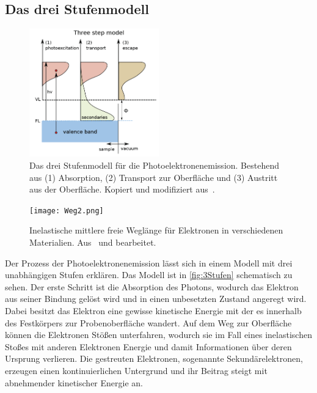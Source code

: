         \subsection{Das drei Stufenmodell} \label{sec:3Stufen}
            \begin{figure}
                \centering
                \includegraphics[width=0.5\textwidth]{3Stufen}
                \caption{Das drei Stufenmodell für die Photoelektronenemission.
                Bestehend aus (1) Absorption, (2) Transport zur Oberfläche und (3) Austritt aus der Oberfläche.
                Kopiert und modifiziert aus~\cite{zhang_synchrotron_2018}.}
                \label{fig:3Stufen}
            \end{figure}
            \begin{figure}
                \centering
                \texttt{[image: Weg2.png]}
                \caption{Inelastische mittlere freie Weglänge für Elektronen in verschiedenen Materialien. Aus~\cite{Hüfner} und bearbeitet.}
                \label{fig:Weg}
            \end{figure}
            Der Prozess der Photoelektronenemission lässt sich in einem Modell mit drei unabhängigen Stufen erklären.
            Das Modell ist in \autoref{fig:3Stufen} schematisch zu sehen.
            Der erste Schritt ist die Absorption des Photons, wodurch das Elektron aus seiner Bindung gelöst wird und in einen unbesetzten Zustand angeregt wird.
            Dabei besitzt das Elektron eine gewisse kinetische Energie mit der es innerhalb des Festkörpers zur Probenoberfläche wandert.
            Auf dem Weg zur Oberfläche können die Elektronen Stößen unterfahren, wodurch sie im Fall eines inelastischen Stoßes mit anderen Elektronen Energie und damit Informationen über deren Ursprung verlieren.
            Die gestreuten Elektronen, sogenannte Sekundärelektronen, erzeugen einen kontinuierlichen Untergrund und ihr Beitrag steigt mit abnehmender kinetischer Energie an.
